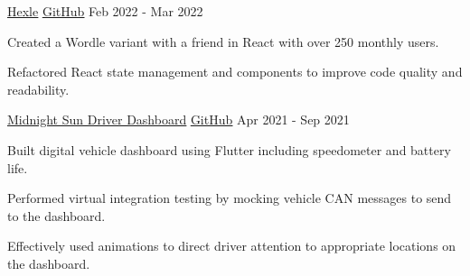 

\begin{cventries}

  \cventry
    {\href{https://frankljin.github.io/hexle/}{\underline{Hexle}}} %
    {\href{https://github.com/frankljin/hexle/}{\underline{GitHub}} \faGithubSquare} %
    {} %
    {Feb 2022 - Mar 2022} %
    {
      \begin{cvitems} %
        \item {Created a Wordle variant with a friend in {React} with over 250 monthly users.}
        \item {Refactored React state management and components to improve code quality and readability.}
      \end{cvitems}
    }

  \cventry
    {\href{https://tinyurl.com/daniel-qu-portfolio}{\underline{Midnight Sun Driver Dashboard}}} %
    {\href{https://github.com/uw-midsun/telemetry_xiv}{\underline{GitHub}} \faGithubSquare}
    {}
    {Apr 2021 - Sep 2021} %
    {
      \begin{cvitems} %
        \item {Built digital vehicle dashboard using {Flutter} including speedometer and battery life.}
        \item {Performed virtual {integration testing} by mocking vehicle CAN messages to send to the dashboard.}
        \item {Effectively used animations to direct driver attention to appropriate locations on the dashboard.}
      \end{cvitems}
    }



\end{cventries}
